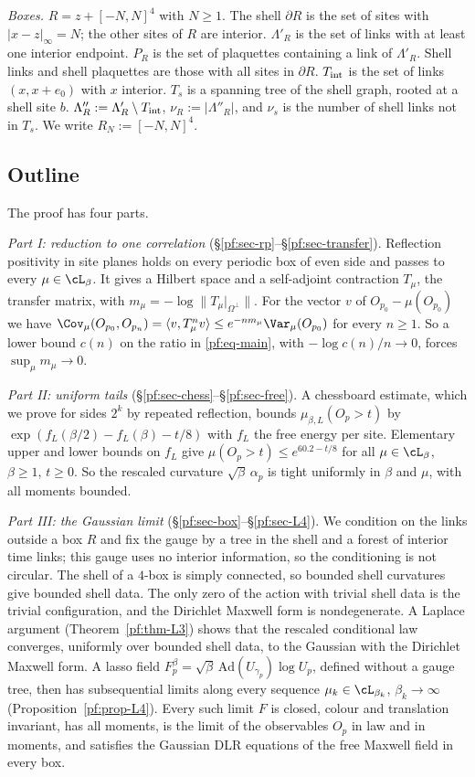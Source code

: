 \emph{Boxes.} $R=z+[-N,N]^4$ with $N\ge1$. The shell $\partial R$ is the set of sites with $|x-z|_\infty=N$; the other sites of $R$ are interior. $\Lambda'_R$ is the set of links with at least one interior endpoint. $P_R$ is the set of plaquettes containing a link of $\Lambda'_R$. Shell links and shell plaquettes are those with all sites in $\partial R$. $T_{\rm int}$ is the set of links $(x,x+e_0)$ with $x$ interior. $T_s$ is a spanning tree of the shell graph, rooted at a shell site $b$. $\Lambda''_R:=\Lambda'_R\setminus T_{\rm int}$, $\nu_R:=|\Lambda''_R|$, and $\nu_s$ is the number of shell links not in $T_s$. We write $R_N:=[-N,N]^4$.

\subsection{Outline}\label{pf:sec-outline}

The proof has four parts.

\emph{Part I: reduction to one correlation} (\S\ref{pf:sec-rp}--\S\ref{pf:sec-transfer}). Reflection positivity in site planes holds on every periodic box of even side and passes to every $\mu\in\cL_\beta$. It gives a Hilbert space and a self-adjoint contraction $T_\mu$, the transfer matrix, with $m_\mu=-\log\|T_\mu|_{\Omega^\perp}\|$. For the vector $v$ of $O_{p_0}-\mu(O_{p_0})$ we have $\Cov_\mu(O_{p_0},O_{p_n})=\langle v,T_\mu^nv\rangle\le e^{-nm_\mu}\Var_\mu(O_{p_0})$ for every $n\ge1$. So a lower bound $c(n)$ on the ratio in \eqref{pf:eq-main}, with $-\log c(n)/n\to0$, forces $\sup_\mu m_\mu\to0$.

\emph{Part II: uniform tails} (\S\ref{pf:sec-chess}--\S\ref{pf:sec-free}). A chessboard estimate, which we prove for sides $2^k$ by repeated reflection, bounds $\mu_{\beta,L}(O_p>t)$ by $\exp(f_L(\beta/2)-f_L(\beta)-t/8)$ with $f_L$ the free energy per site. Elementary upper and lower bounds on $f_L$ give $\mu(O_p>t)\le e^{60.2-t/8}$ for all $\mu\in\cL_\beta$, $\beta\ge1$, $t\ge0$. So the rescaled curvature $\sqrt\beta\,\alpha_p$ is tight uniformly in $\beta$ and $\mu$, with all moments bounded.

\emph{Part III: the Gaussian limit} (\S\ref{pf:sec-box}--\S\ref{pf:sec-L4}). We condition on the links outside a box $R$ and fix the gauge by a tree in the shell and a forest of interior time links; this gauge uses no interior information, so the conditioning is not circular. The shell of a $4$-box is simply connected, so bounded shell curvatures give bounded shell data. The only zero of the action with trivial shell data is the trivial configuration, and the Dirichlet Maxwell form is nondegenerate. A Laplace argument (Theorem~\ref{pf:thm-L3}) shows that the rescaled conditional law converges, uniformly over bounded shell data, to the Gaussian with the Dirichlet Maxwell form. A lasso field $F^\beta_p=\sqrt\beta\,\mathrm{Ad}(U_{\gamma_p})\log U_p$, defined without a gauge tree, then has subsequential limits along every sequence $\mu_k\in\cL_{\beta_k}$, $\beta_k\to\infty$ (Proposition~\ref{pf:prop-L4}). Every such limit $F$ is closed, colour and translation invariant, has all moments, is the limit of the observables $O_p$ in law and in moments, and satisfies the Gaussian DLR equations of the free Maxwell field in every box.

